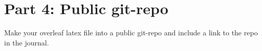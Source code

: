 \documentclass[a4paper]{article}
\begin{document}
\section{Part 4: Public git-repo}

Make your overleaf latex file into a public git-repo and include a link to the repo in the journal. 








\end{document}
